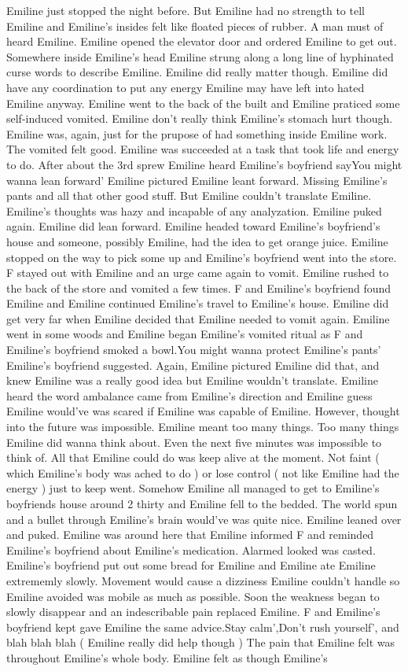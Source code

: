 \documentclass[12pt]{book}
\begin{document}
Emiline just stopped the night before. But Emiline had no strength to tell Emiline and Emiline's insides felt like floated pieces of rubber. A man must of heard Emiline. Emiline opened the elevator door and ordered Emiline to get out. Somewhere inside Emiline's head Emiline strung along a long line of hyphinated curse words to describe Emiline. Emiline did really matter though. Emiline did have any coordination to put any energy Emiline may have left into hated Emiline anyway. Emiline went to the back of the built and Emiline praticed some self-induced vomited. Emiline don't really think Emiline's stomach hurt though. Emiline was, again, just for the prupose of had something inside Emiline work. The vomited felt good. Emiline was succeeded at a task that took life and energy to do. After about the 3rd sprew Emiline heard Emiline's boyfriend sayYou might wanna lean forward' Emiline pictured Emiline leant forward. Missing Emiline's pants and all that other good stuff. But Emiline couldn't translate Emiline. Emiline's thoughts was hazy and incapable of any analyzation. Emiline puked again. Emiline did lean forward. Emiline headed toward Emiline's boyfriend's house and someone, possibly Emiline, had the idea to get orange juice. Emiline stopped on the way to pick some up and Emiline's boyfriend went into the store. F stayed out with Emiline and an urge came again to vomit. Emiline rushed to the back of the store and vomited a few times. F and Emiline's boyfriend found Emiline and Emiline continued Emiline's travel to Emiline's house. Emiline did get very far when Emiline decided that Emiline needed to vomit again. Emiline went in some woods and Emiline began Emiline's vomited ritual as F and Emiline's boyfriend smoked a bowl.You might wanna protect Emiline's pants' Emiline's boyfriend suggested. Again, Emiline pictured Emiline did that, and knew Emiline was a really good idea but Emiline wouldn't translate. Emiline heard the word ambalance came from Emiline's direction and Emiline guess Emiline would've was scared if Emiline was capable of Emiline. However, thought into the future was impossible. Emiline meant too many things. Too many things Emiline did wanna think about. Even the next five minutes was impossible to think of. All that Emiline could do was keep alive at the moment. Not faint ( which Emiline's body was ached to do ) or lose control ( not like Emiline had the energy ) just to keep went. Somehow Emiline all managed to get to Emiline's boyfriends house around 2 thirty and Emiline fell to the bedded. The world spun and a bullet through Emiline's brain would've was quite nice. Emiline leaned over and puked. Emiline was around here that Emiline informed F and reminded Emiline's boyfriend about Emiline's medication. Alarmed looked was casted. Emiline's boyfriend put out some bread for Emiline and Emiline ate Emiline extrememly slowly. Movement would cause a dizziness Emiline couldn't handle so Emiline avoided was mobile as much as possible. Soon the weakness began to slowly disappear and an indescribable pain replaced Emiline. F and Emiline's boyfriend kept gave Emiline the same advice.Stay calm',Don't rush yourself', and blah blah blah ( Emiline really did help though ) The pain that Emiline felt was throughout Emiline's whole body. Emiline felt as though Emiline's 
\end{document}
